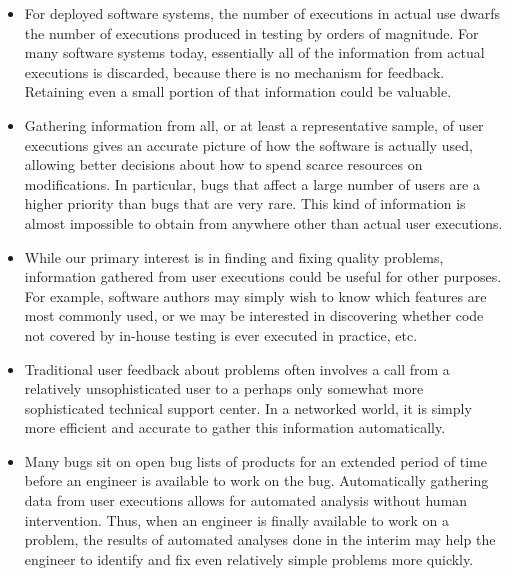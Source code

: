 \begin{itemize}
  
\item For deployed software systems, the number of executions in
  actual use dwarfs the number of executions produced in testing by
  orders of magnitude.  For many software systems today, essentially
  all of the information from actual executions is discarded, because
  there is no mechanism for feedback.  Retaining even a small portion
  of that information could be valuable.
  
\item Gathering information from all, or at least a representative
  sample, of user executions gives an accurate picture of how the
  software is actually used, allowing better decisions about how to
  spend scarce resources on modifications. In particular, bugs that
  affect a large number of users are a higher priority than bugs that
  are very rare.  This kind of information is almost impossible to
  obtain from anywhere other than actual user executions.
  
\item While our primary interest is in finding and fixing quality
  problems, information gathered from user executions could be useful
  for other purposes.  For example, software authors may simply wish
  to know which features are most commonly used, or we may be
  interested in discovering whether code not covered by in-house
  testing is ever executed in practice, etc.
  
\item Traditional user feedback about problems often involves a call
  from a relatively unsophisticated user to a perhaps only somewhat
  more sophisticated technical support center.  In a networked world,
  it is simply more efficient and accurate to gather this information
  automatically.
  
\item Many bugs sit on open bug lists of products for an extended
  period of time before an engineer is available to work on the bug.
  Automatically gathering data from user executions allows for
  automated analysis without human intervention.  Thus, when an
  engineer is finally available to work on a problem, the results of
  automated analyses done in the interim may help the engineer to
  identify and fix even relatively simple problems more quickly.
  

\end{itemize}

